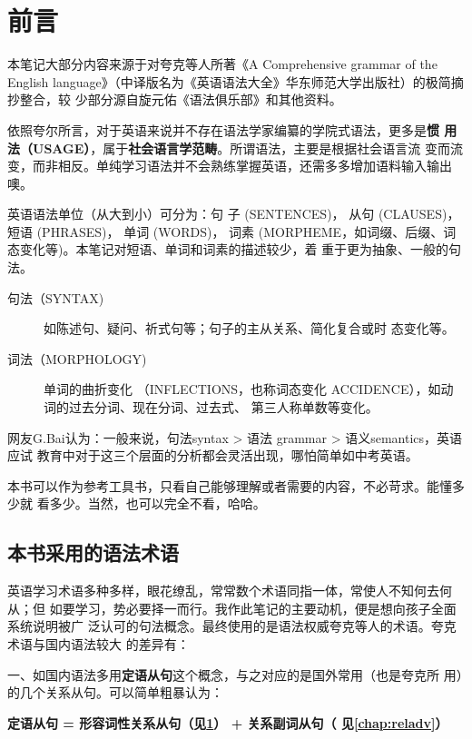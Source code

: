 \chapter{前言}

本笔记大部分内容来源于对夸克等人所著《A Comprehensive grammar of the English
language》（中译版名为《英语语法大全》华东师范大学出版社）的极简摘抄整合，较
少部分源自旋元佑《语法俱乐部》和其他资料。


依照夸尔所言，对于英语来说并不存在语法学家编纂的学院式语法，更多是\textbf{惯
  用法（USAGE）}，属于\textbf{社会语言学范畴}。所谓语法，主要是根据社会语言流
变而流变，而非相反。单纯学习语法并不会熟练掌握英语，还需多多增加语料输入输出噢。

英语语法单位（从大到小）可分为：句
子 (SENTENCES)， 从句 (CLAUSES)， 短语 (PHRASES)， 单词 (WORDS)， 词素
(MORPHEME，如词缀、后缀、词态变化等)。本笔记对短语、单词和词素的描述较少，着
重于更为抽象、一般的句法。
\begin{description}
\item [句法（SYNTAX)] 如陈述句、疑问、祈式句等；句子的主从关系、简化复合或时
  态变化等。
\item [词法（MORPHOLOGY)] 单词的曲折变化
  （INFLECTIONS，也称词态变化 ACCIDENCE），如动词的过去分词、现在分词、过去式、
  第三人称单数等变化。
\end{description}

网友G.Bai认为：一般来说，句法syntax > 语法 grammar > 语义semantics，英语应试
教育中对于这三个层面的分析都会灵活出现，哪怕简单如中考英语。

本书可以作为参考工具书，只看自己能够理解或者需要的内容，不必苛求。能懂多少就
看多少。当然，也可以完全不看，哈哈。

\section*{本书采用的语法术语}

英语学习术语多种多样，眼花缭乱，常常数个术语同指一体，常使人不知何去何从；但
如要学习，势必要择一而行。我作此笔记的主要动机，便是想向孩子全面系统说明被广
泛认可的句法概念。最终使用的是语法权威夸克等人的术语。夸克术语与国内语法较大
的差异有：

一、如国内语法多用\textbf{定语从句}这个概念，与之对应的是国外常用（也是夸克所
用）的几个关系从句。可以简单粗暴认为：

\textbf{定语从句 = 形容词性关系从句（见\cref{}） + 关系副词从句（
  见\cref{chap:reladv}）}

